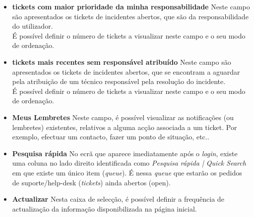 \begin{itemize}
\item \textbf{tickets com maior prioridade da minha responsabilidade}
\subitem Neste campo são apresentados os tickets de incidentes abertos, que são da responsabilidade do utilizador.\\
É possível definir o número de tickets a visualizar neste campo e o seu modo de ordenação.

\item \textbf{tickets mais recentes sem responsável atribuído}
\subitem Neste campo são apresentados os tickets de incidentes abertos, que se encontram a aguardar pela atribuição de um técnico responsável pela resolução do incidente.\\
É possível definir o número de tickets a visualizar neste campo e o seu modo de ordenação.

\item \textbf{Meus Lembretes}
\subitem Neste campo, é possível visualizar as notificações (ou lembretes) existentes, relativos a alguma acção associada a um ticket. Por exemplo, efectuar um contacto, fazer um ponto de situação, etc..
\item \textbf{Pesquisa rápida}
\subitem No ecrã que aparece imediatamente após o \emph{login}, existe uma coluna no lado direito identificada como \emph{Pesquisa rápida | Quick Search} em que existe um único item (\emph{queue}).
É nessa \emph{queue} que estarão os pedidos de suporte/help-desk (\emph{tickets}) ainda abertos (open).
\item \textbf{Actualizar}
\subitem Nesta caixa de selecção, é possível definir a frequência de actualização da informação disponibilizada na página inicial.
\end{itemize}



